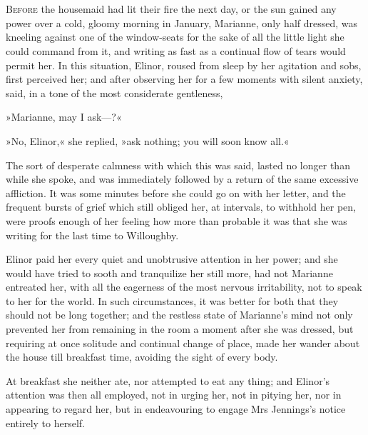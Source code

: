 \chapter[Chapter \thechapter]{}
\lettrine[lines=4,lraise=0.3]{B}{efore} the housemaid had lit their fire the next day, or the sun gained any power over a cold, gloomy morning in January, Marianne, only half dressed, was kneeling against one of the window-seats for the sake of all the little light she could command from it, and writing as fast as a continual flow of tears would permit her. In this situation, Elinor, roused from sleep by her agitation and sobs, first perceived her; and after observing her for a few moments with silent anxiety, said, in a tone of the most considerate gentleness,

»Marianne, may I ask—?«

»No, Elinor,« she replied, »ask nothing; you will soon know all.«

The sort of desperate calmness with which this was said, lasted no longer than while she spoke, and was immediately followed by a return of the same excessive affliction. It was some minutes before she could go on with her letter, and the frequent bursts of grief which still obliged her, at intervals, to withhold her pen, were proofs enough of her feeling how more than probable it was that she was writing for the last time to Willoughby.

Elinor paid her every quiet and unobtrusive attention in her power; and she would have tried to sooth and tranquilize her still more, had not Marianne entreated her, with all the eagerness of the most nervous irritability, not to speak to her for the world. In such circumstances, it was better for both that they should not be long together; and the restless state of Marianne’s mind not only prevented her from remaining in the room a moment after she was dressed, but requiring at once solitude and continual change of place, made her wander about the house till breakfast time, avoiding the sight of every body.

At breakfast she neither ate, nor attempted to eat any thing; and Elinor’s attention was then all employed, not in urging her, not in pitying her, nor in appearing to regard her, but in endeavouring to engage Mrs Jennings’s notice entirely to herself.

